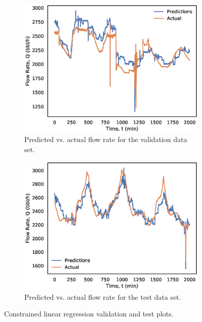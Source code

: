 \begin{figure}[h]
     \centering
     \begin{subfigure}[b]{0.48\textwidth}
         \centering
         \includegraphics[width=\textwidth]{images/suncor/08ConstrainedLS_validation.eps}
         \caption{Predicted vs. actual flow rate for the validation data set.}
         \label{fig:08CLSValidation}
     \end{subfigure}
     \hfill
     \begin{subfigure}[b]{0.48\textwidth}
         \centering
         \includegraphics[width=\textwidth]{images/suncor/08ConstrainedLS_test.eps}
         \caption{Predicted vs. actual flow rate for the test data set.}
         \label{fig:08CLSTest}
     \end{subfigure}
        \caption{Constrained linear regression validation and test plots.}
        \label{fig:08CLSPlots}
\end{figure}

